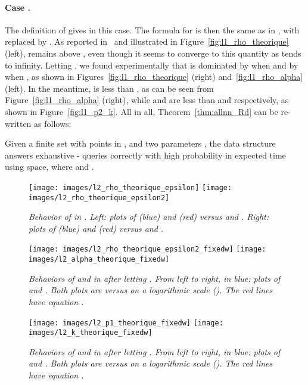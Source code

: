 \paragraph{Case .}
The definition of  gives  in this
case. The formula for  is then the same as in , with
 replaced by . As reported in~\cite{DIIM04} and
illustrated in Figure~\ref{fig:l1_rho_theorique} (left), 
remains above , even though it seems to
converge to this quantity as  tends to infinity. Letting
, we found experimentally that  is dominated
by  when  and by
 when , as shown in
Figures~\ref{fig:l1_rho_theorique} (right) and~\ref{fig:l1_rho_alpha}
(left). In the meantime,  is less than , as
can be seen from Figure~\ref{fig:l1_rho_alpha} (right), while
 and  are less
than  and  respectively, as shown in Figure~\ref{fig:l1_p2_k}.
All in all, Theorem~\ref{thm:allnn_Rd} can be re-written as follows:
\addtocounter{thm}{-1}
\begin{thm}[case ] \label{thm:allnn_Rd_l1}
  Given a finite set  with  points in , and two
  parameters , the  data
    structure answers exhaustive -\pleb
  queries correctly with high probability in expected  time using
     space, where  and .
\end{thm}


\begin{figure}[!htb]
\centering
\texttt{[image: images/l2\_rho\_theorique\_epsilon]}
\texttt{[image: images/l2\_rho\_theorique\_epsilon2]}
\caption{\em Behavior of  in . Left: plots
  of  (blue) and
   (red) versus 
  and .  Right: plots of  (blue) and
   (red) versus  and .}
\label{fig:l2_rho_theorique}
\end{figure}

\begin{figure}[!htb]
\centering
\texttt{[image: images/l2\_rho\_theorique\_epsilon2\_fixedw]}
\texttt{[image: images/l2\_alpha\_theorique\_fixedw]}
\caption{\em Behaviors of  and  in  after letting . From left to right, in
  blue: plots of  and
  . Both plots are versus
   on a logarithmic scale (). The red lines have
  equation .}
\label{fig:l2_rho_alpha}
\end{figure}

\begin{figure}[!htb]
\centering
\texttt{[image: images/l2\_p1\_theorique\_fixedw]}
\texttt{[image: images/l2\_k\_theorique\_fixedw]}
\caption{\em Behaviors of  and
   in  after
  letting . From left to right, in blue: plots of
   and
  . Both plots are versus
   on a logarithmic scale (). The red lines have
  equation .}
\label{fig:l2_p2_k}
\end{figure}

